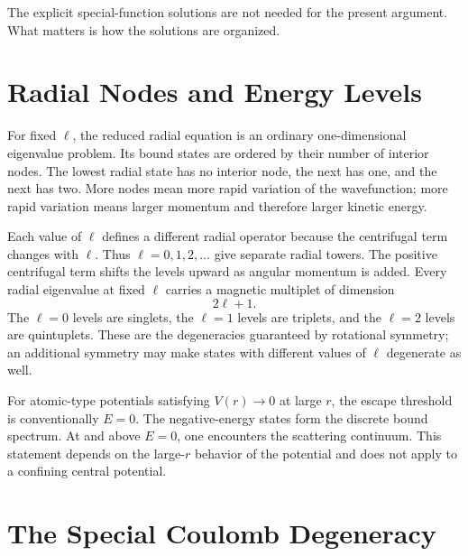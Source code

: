 \begin{classroomqa}
\end{classroomqa}

The explicit special-function solutions are not needed for the present argument. What matters is how the solutions are organized.

\section{Radial Nodes and Energy Levels}

For fixed \(\ell\), the reduced radial equation is an ordinary one-dimensional eigenvalue problem. Its bound states are ordered by their number of interior nodes. The lowest radial state has no interior node, the next has one, and the next has two. More nodes mean more rapid variation of the wavefunction; more rapid variation means larger momentum and therefore larger kinetic energy.

Each value of \(\ell\) defines a different radial operator because the centrifugal term changes with \(\ell\). Thus \(\ell=0,1,2,\ldots\) give separate radial towers. The positive centrifugal term shifts the levels upward as angular momentum is added. Every radial eigenvalue at fixed \(\ell\) carries a magnetic multiplet of dimension
\begin{equation}
2\ell+1.
\end{equation}
The \(\ell=0\) levels are singlets, the \(\ell=1\) levels are triplets, and the \(\ell=2\) levels are quintuplets. These are the degeneracies guaranteed by rotational symmetry; an additional symmetry may make states with different values of \(\ell\) degenerate as well.

For atomic-type potentials satisfying \(V(r)\to0\) at large \(r\), the escape threshold is conventionally \(E=0\). The negative-energy states form the discrete bound spectrum. At and above \(E=0\), one encounters the scattering continuum. This statement depends on the large-\(r\) behavior of the potential and does not apply to a confining central potential.

\section{The Special Coulomb Degeneracy}

